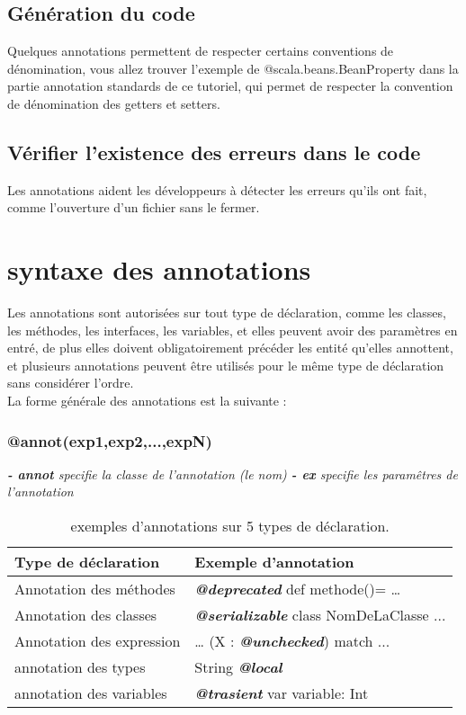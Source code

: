\documentclass[runningheads]{llncs}
\begin{document}
\subsection{Génération du code}
	Quelques annotations permettent de respecter certains conventions de dénomination, vous allez trouver l’exemple de @scala.beans.BeanProperty dans la partie annotation standards de ce tutoriel, qui permet de respecter la convention de dénomination des getters et setters. 

\subsection{Vérifier l'existence des erreurs dans le code}
	Les annotations aident les développeurs à détecter les erreurs qu’ils ont fait, comme l’ouverture d’un fichier sans le fermer.




\section{syntaxe des annotations}
Les annotations sont autorisées sur tout type de déclaration, comme les classes, les méthodes, les interfaces, les variables, et elles peuvent avoir des paramètres en entré, de plus elles doivent obligatoirement précéder les entité qu'elles annottent, et plusieurs annotations peuvent être utilisés pour le même type de déclaration sans considérer l’ordre.\\

La forme générale des annotations est la suivante :
\subsubsection{@annot(exp1,exp2,...,expN)\newline}

\textit{\textbf{- annot} specifie la classe de l'annotation (le nom)\newline
\textbf{ - ex} specifie les paramêtres de l'annotation}




\begin{table}
\caption{exemples d’annotations sur 5 types de déclaration.}\label{tab1}
\begin{tabular}{|l|l|}
\hline
Type de déclaration &  Exemple d’annotation\\
\hline

Annotation des méthodes & \textbf{\textit{@deprecated}} def methode()= …\\
Annotation des classes & \textbf{\textit{@serializable}} class NomDeLaClasse{ ... }\\
Annotation des expression &  … (X : \textbf{\textit{@unchecked}}) match{ ... }\\
annotation des types & String \textit{\textbf{@local}}\\
annotation des variables & \textit{\textbf{@trasient}} var variable: Int\\
\hline
\end{tabular}
\end{table}
\end{document}
